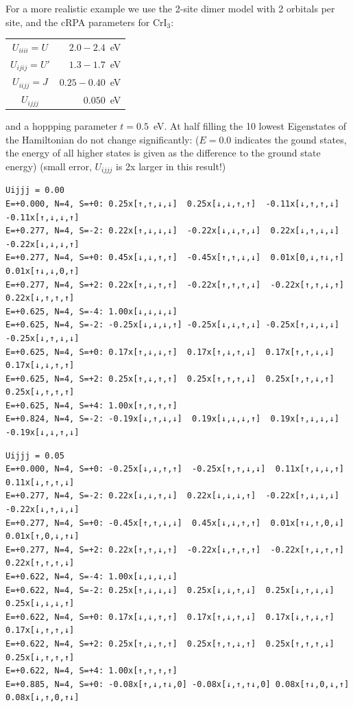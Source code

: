 \documentclass[12pt,a4paper]{scrartcl}
\numberwithin{equation}{section}
\begin{document}
For a more realistic example we use the 2-site dimer model with 2 orbitals per site, and the cRPA parameters for CrI$_3$:
\begin{center}
\begin{tabular}{|c|r|}
\hline
 $U_{iiii}=U$ & $ 2.0-2.4$~eV \\
 $U_{ijij}=U'$ & $ 1.3-1.7$~eV \\
 $U_{iijj}=J$ & $ 0.25-0.40$~eV \\ \hline
 $U_{ijjj}$ & $ 0.050$~eV \\ \hline
\end{tabular}
\end{center}
and a hoppping parameter $t=0.5$~eV. At half filling the 10 lowest Eigenstates of the Hamiltonian do not change significantly: ($E=0.0$ indicates the gound states, the energy of all higher states is given as the difference to the ground state energy)
(small error, $U_{ijjj}$ is 2x larger in this result!)
\begin{small}
\begin{verbatim}
Uijjj = 0.00
E=+0.000, N=4, S=+0: 0.25x[↑,↑,↓,↓]  0.25x[↓,↓,↑,↑]  -0.11x[↓,↑,↑,↓]  -0.11x[↑,↓,↓,↑]
E=+0.277, N=4, S=-2: 0.22x[↑,↓,↓,↓]  -0.22x[↓,↓,↑,↓]  0.22x[↓,↑,↓,↓]  -0.22x[↓,↓,↓,↑]   
E=+0.277, N=4, S=+0: 0.45x[↓,↓,↑,↑]  -0.45x[↑,↑,↓,↓]  0.01x[0,↓,↑↓,↑] 0.01x[↑↓,↓,0,↑]   
E=+0.277, N=4, S=+2: 0.22x[↑,↓,↑,↑]  -0.22x[↑,↑,↑,↓]  -0.22x[↑,↑,↓,↑]  0.22x[↓,↑,↑,↑]   
E=+0.625, N=4, S=-4: 1.00x[↓,↓,↓,↓]   
E=+0.625, N=4, S=-2: -0.25x[↓,↓,↓,↑] -0.25x[↓,↓,↑,↓] -0.25x[↑,↓,↓,↓] -0.25x[↓,↑,↓,↓]   
E=+0.625, N=4, S=+0: 0.17x[↑,↓,↓,↑]  0.17x[↑,↓,↑,↓]  0.17x[↑,↑,↓,↓]  0.17x[↓,↓,↑,↑]   
E=+0.625, N=4, S=+2: 0.25x[↑,↓,↑,↑]  0.25x[↑,↑,↑,↓]  0.25x[↑,↑,↓,↑]  0.25x[↓,↑,↑,↑]   
E=+0.625, N=4, S=+4: 1.00x[↑,↑,↑,↑]   
E=+0.824, N=4, S=-2: -0.19x[↓,↑,↓,↓]  0.19x[↓,↓,↓,↑]  0.19x[↑,↓,↓,↓]  -0.19x[↓,↓,↑,↓]
\end{verbatim}
\begin{verbatim}
Uijjj = 0.05
E=+0.000, N=4, S=+0: -0.25x[↓,↓,↑,↑]  -0.25x[↑,↑,↓,↓]  0.11x[↑,↓,↓,↑]  0.11x[↓,↑,↑,↓]  
E=+0.277, N=4, S=-2: 0.22x[↓,↓,↑,↓]  0.22x[↓,↓,↓,↑]  -0.22x[↑,↓,↓,↓]  -0.22x[↓,↑,↓,↓]   
E=+0.277, N=4, S=+0: -0.45x[↑,↑,↓,↓]  0.45x[↓,↓,↑,↑]  0.01x[↑↓,↑,0,↓] 0.01x[↑,0,↓,↑↓]   
E=+0.277, N=4, S=+2: 0.22x[↑,↑,↓,↑]  -0.22x[↓,↑,↑,↑]  -0.22x[↑,↓,↑,↑]  0.22x[↑,↑,↑,↓]
E=+0.622, N=4, S=-4: 1.00x[↓,↓,↓,↓]   
E=+0.622, N=4, S=-2: 0.25x[↑,↓,↓,↓]  0.25x[↓,↓,↑,↓]  0.25x[↓,↑,↓,↓]  0.25x[↓,↓,↓,↑]   
E=+0.622, N=4, S=+0: 0.17x[↓,↓,↑,↑]  0.17x[↑,↓,↑,↓]  0.17x[↓,↑,↓,↑]  0.17x[↓,↑,↑,↓]   
E=+0.622, N=4, S=+2: 0.25x[↑,↓,↑,↑]  0.25x[↑,↑,↓,↑]  0.25x[↑,↑,↑,↓]  0.25x[↓,↑,↑,↑]   
E=+0.622, N=4, S=+4: 1.00x[↑,↑,↑,↑]   
E=+0.885, N=4, S=+0: -0.08x[↑,↓,↑↓,0] -0.08x[↓,↑,↑↓,0] 0.08x[↑↓,0,↓,↑] 0.08x[↓,↑,0,↑↓]
\end{verbatim}
\end{small}
\end{document}
